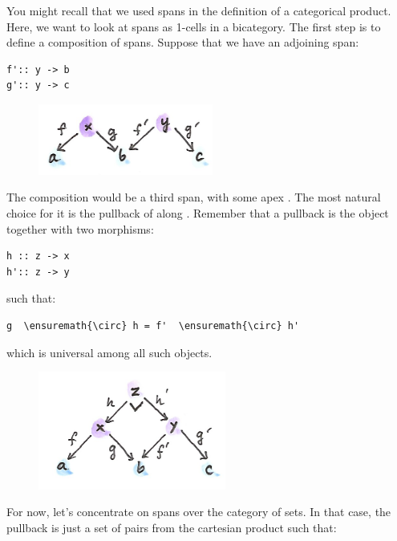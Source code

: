 \noindent
You might recall that we used spans in the definition of a categorical
product. Here, we want to look at spans as 1-cells in a bicategory. The
first step is to define a composition of spans. Suppose that we have an
adjoining span:

\begin{Verbatim}[commandchars=\\\{\}]
f':: y -> b
g':: y -> c
\end{Verbatim}

\begin{figure}[H]
\centering
\includegraphics[width=2.26042in]{images/compspan.png}
\end{figure}

\noindent
The composition would be a third span, with some apex . The
most natural choice for it is the pullback of  along
. Remember that a pullback is the object 
together with two morphisms:

\begin{Verbatim}[commandchars=\\\{\}]
h :: z -> x
h':: z -> y
\end{Verbatim}
such that:

\begin{Verbatim}[commandchars=\\\{\}]
g  \ensuremath{\circ} h = f'  \ensuremath{\circ} h'
\end{Verbatim}
which is universal among all such objects.

\begin{figure}[H]
\centering
\includegraphics[width=2.42708in]{images/pullspan.png}\\
\end{figure}

\noindent
For now, let's concentrate on spans over the category of sets. In that
case, the pullback is just a set of pairs  from the
cartesian product  such that:

